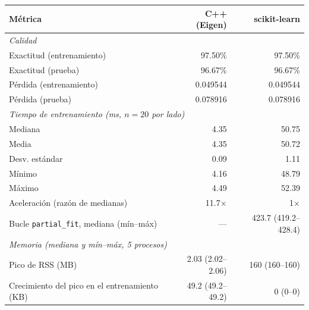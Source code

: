 \begin{tabular}{lrr}
\toprule
Métrica & C++ (Eigen) & scikit-learn \\
\midrule
\multicolumn{3}{l}{\textit{Calidad}} \\
Exactitud (entrenamiento) & 97.50\% & 97.50\% \\
Exactitud (prueba) & 96.67\% & 96.67\% \\
Pérdida (entrenamiento) & 0.049544 & 0.049544 \\
Pérdida (prueba) & 0.078916 & 0.078916 \\
\midrule
\multicolumn{3}{l}{\textit{Tiempo de entrenamiento (ms, $n=20$ por lado)}} \\
Mediana & 4.35 & 50.75 \\
Media & 4.35 & 50.72 \\
Desv. estándar & 0.09 & 1.11 \\
Mínimo & 4.16 & 48.79 \\
Máximo & 4.49 & 52.39 \\
Aceleración (razón de medianas) & 11.7$\times$ & 1$\times$ \\
Bucle \texttt{partial\_fit}, mediana (mín--máx) & --- & 423.7 (419.2--428.4) \\
\midrule
\multicolumn{3}{l}{\textit{Memoria (mediana y mín--máx, 5 procesos)}} \\
Pico de RSS (MB) & 2.03 (2.02--2.06) & 160 (160--160) \\
Crecimiento del pico en el entrenamiento (KB) & 49.2 (49.2--49.2) & 0 (0--0) \\
\bottomrule
\end{tabular}
